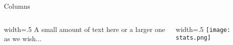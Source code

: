 \documentclass{beamer} %
\begin{document}

\begin{frame}{Columns}
    \begin{columns}
        \begin{column}{width=.5\textwidth}
            A small amount of text  here or a larger one as we wish...
        \end{column}
        \begin{column}{width=.5\textwidth}
            \texttt{[image: stats.png]}
        \end{column}
    \end{columns}
\end{frame}
\end{document}
